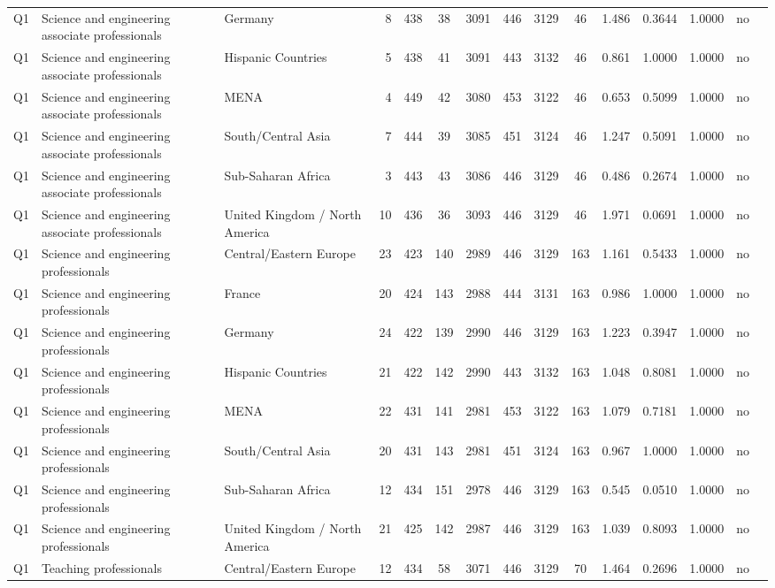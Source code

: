 \begin{longtable}{lllrcccccccccll}
Q1 & Science and engineering associate professionals & Germany & 8 & 438 & 38 & 3091 & 446 & 3129 & 46 & 1.486 & 0.3644 & 1.0000 & no \\
Q1 & Science and engineering associate professionals & Hispanic Countries & 5 & 438 & 41 & 3091 & 443 & 3132 & 46 & 0.861 & 1.0000 & 1.0000 & no \\
Q1 & Science and engineering associate professionals & MENA & 4 & 449 & 42 & 3080 & 453 & 3122 & 46 & 0.653 & 0.5099 & 1.0000 & no \\
Q1 & Science and engineering associate professionals & South/Central Asia & 7 & 444 & 39 & 3085 & 451 & 3124 & 46 & 1.247 & 0.5091 & 1.0000 & no \\
Q1 & Science and engineering associate professionals & Sub-Saharan Africa & 3 & 443 & 43 & 3086 & 446 & 3129 & 46 & 0.486 & 0.2674 & 1.0000 & no \\
Q1 & Science and engineering associate professionals & United Kingdom / North America & 10 & 436 & 36 & 3093 & 446 & 3129 & 46 & 1.971 & 0.0691 & 1.0000 & no \\
Q1 & Science and engineering professionals & Central/Eastern Europe & 23 & 423 & 140 & 2989 & 446 & 3129 & 163 & 1.161 & 0.5433 & 1.0000 & no \\
Q1 & Science and engineering professionals & France & 20 & 424 & 143 & 2988 & 444 & 3131 & 163 & 0.986 & 1.0000 & 1.0000 & no \\
Q1 & Science and engineering professionals & Germany & 24 & 422 & 139 & 2990 & 446 & 3129 & 163 & 1.223 & 0.3947 & 1.0000 & no \\
Q1 & Science and engineering professionals & Hispanic Countries & 21 & 422 & 142 & 2990 & 443 & 3132 & 163 & 1.048 & 0.8081 & 1.0000 & no \\
Q1 & Science and engineering professionals & MENA & 22 & 431 & 141 & 2981 & 453 & 3122 & 163 & 1.079 & 0.7181 & 1.0000 & no \\
Q1 & Science and engineering professionals & South/Central Asia & 20 & 431 & 143 & 2981 & 451 & 3124 & 163 & 0.967 & 1.0000 & 1.0000 & no \\
Q1 & Science and engineering professionals & Sub-Saharan Africa & 12 & 434 & 151 & 2978 & 446 & 3129 & 163 & 0.545 & 0.0510 & 1.0000 & no \\
Q1 & Science and engineering professionals & United Kingdom / North America & 21 & 425 & 142 & 2987 & 446 & 3129 & 163 & 1.039 & 0.8093 & 1.0000 & no \\
Q1 & Teaching professionals & Central/Eastern Europe & 12 & 434 & 58 & 3071 & 446 & 3129 & 70 & 1.464 & 0.2696 & 1.0000 & no \\

\end{longtable}
